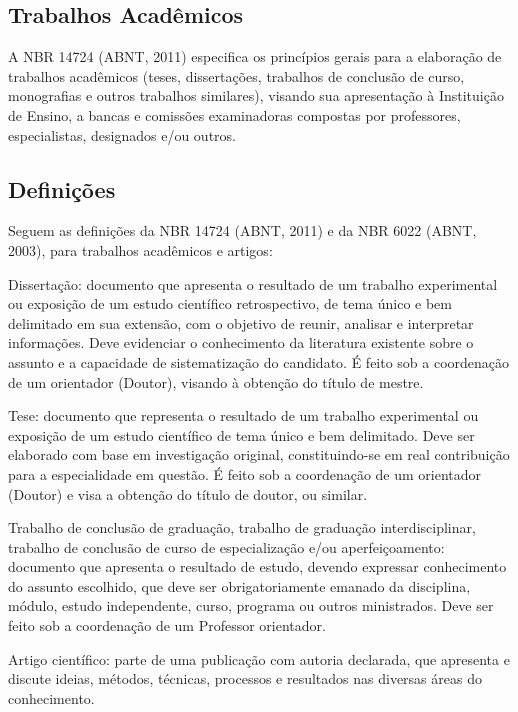 \documentclass[a4paper,12pt]{article}  %
\begin{document}
\begin{ElementosTextuais}
\begin{Introducao}
\end{Introducao}

\begin{Desenvolvimento} %

\section{Trabalhos Acadêmicos}
A NBR 14724 (ABNT, 2011) especifica os princípios gerais para a elaboração de trabalhos acadêmicos (teses, dissertações, trabalhos de conclusão de curso, monografias e outros trabalhos similares), visando sua apresentação à Instituição de Ensino, a bancas e comissões examinadoras compostas por professores, especialistas, designados e/ou outros.

\subsection{Definições}
Seguem as definições da NBR 14724 (ABNT, 2011) e da NBR 6022 (ABNT, 2003), para trabalhos acadêmicos e artigos:

\begin{alphaitemize}
    \item Dissertação: documento que apresenta o resultado de um trabalho experimental ou exposição de um estudo científico retrospectivo, de tema único e bem delimitado em sua extensão, com o objetivo de reunir, analisar e interpretar informações. Deve evidenciar o conhecimento da literatura existente sobre o assunto e a capacidade de sistematização do candidato. É feito sob a coordenação de um orientador (Doutor), visando à obtenção do título de mestre.
    \item Tese: documento que representa o resultado de um trabalho experimental ou exposição de um estudo científico de tema único e bem delimitado. Deve ser elaborado com base em investigação original, constituindo-se em real contribuição para a especialidade em questão. É feito sob a coordenação de um orientador (Doutor) e visa a obtenção do título de doutor, ou similar.
    \item Trabalho de conclusão de graduação, trabalho de graduação interdisciplinar, trabalho de conclusão de curso de especialização e/ou aperfeiçoamento: documento que apresenta o resultado de estudo, devendo expressar conhecimento do assunto escolhido, que deve ser obrigatoriamente emanado da disciplina, módulo, estudo independente, curso, programa ou outros ministrados. Deve ser feito sob a coordenação de um Professor orientador.
    \item Artigo científico: parte de uma publicação com autoria declarada, que apresenta e discute ideias, métodos, técnicas, processos e resultados nas diversas áreas do conhecimento.
\end{alphaitemize}


\end{Desenvolvimento}
\end{ElementosTextuais}
\end{document}
